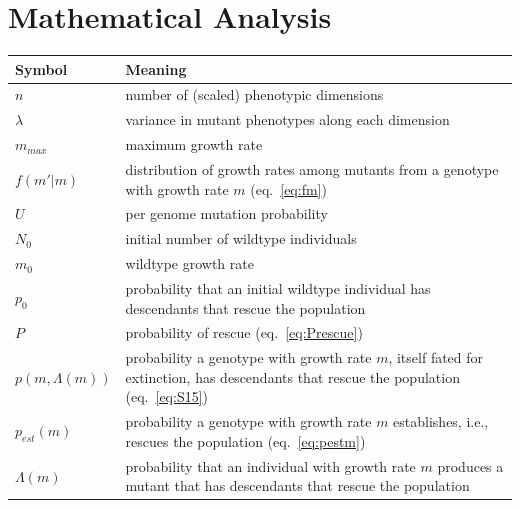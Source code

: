 \documentclass[9pt,twocolumn,twoside,lineno]{gsajnl}
\begin{document}
\section{Mathematical Analysis}
\label{sec:analysis}

\begin{table}[!h]
\begin{tabular}{p{1.5cm} p{6.5cm}}
\hline
Symbol & Meaning \\
\hline
\hline
$n$ & number of (scaled) phenotypic dimensions\\
$\lambda$ & variance in mutant phenotypes along each dimension\\
$m_{max}$ & maximum growth rate\\
$f(m'|m)$ & distribution of growth rates among mutants from a genotype with growth rate $m$ (eq.\ \ref{eq:fm})\\
$U$ & per genome mutation probability\\ 
$N_0$ & initial number of wildtype individuals\\
$m_0$ & wildtype growth rate\\
$p_0$ & probability that an initial wildtype individual has descendants that rescue the population\\
$P$ & probability of rescue (eq.\ \ref{eq:Prescue})\\
$p(m,\Lambda(m))$ & probability a genotype with growth rate $m$, itself fated for extinction, has descendants that rescue the population (eq.\ \ref{eq:S15})\\
$p_{est}(m)$ & probability a genotype with growth rate $m$ establishes, i.e., rescues the population (eq.\ \ref{eq:pestm})\\
$\Lambda(m)$ & probability that an individual with growth rate $m$ produces a mutant that has descendants that rescue the population\\

\end{tabular}
\end{table}
\end{document}
